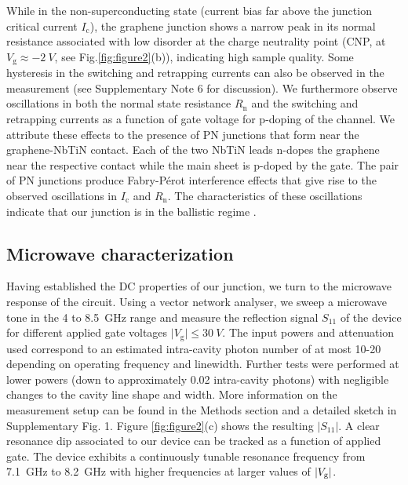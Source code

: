 \documentclass[preprint,
  onecolumn,
  notitlepage,
  amsmath,amssymb,
  aip,
  apl,
]{revtex4-1}
\begin{document}
While in the non-superconducting state (current bias far above the junction critical current $I_\textrm{c}$), the graphene junction shows a narrow peak in its normal resistance associated with low disorder at the charge neutrality point (CNP, at $V_\textrm{g}\approx\SI{-2}{V}$, see Fig.\ref{fig:figure2}(b)), indicating high sample quality.
Some hysteresis in the switching and retrapping currents can also be observed in the measurement (see Supplementary Note 6 for discussion).
We furthermore observe oscillations in both the normal state resistance $R_\textrm{n}$ and the switching and retrapping currents as a function of gate voltage for p-doping of the channel.
We attribute these effects to the presence of PN junctions that form near the graphene-NbTiN contact.
Each of the two NbTiN leads n-dopes the graphene near the respective contact while the main sheet is p-doped by the gate.
The pair of PN junctions produce Fabry-P\'erot interference effects that give rise to the observed oscillations in $I_\textrm{c}$ and $R_\textrm{n}$.
The characteristics of these oscillations indicate that our junction is in the ballistic regime \cite{liang_fabry_2001,miao_phasecoherent_2007,young_quantum_2009,cho_massless_2011,wu_quantum_2012,campos_quantum_2012,rickhaus_ballistic_2013,benshalom_quantum_2015,calado_ballistic_2015a,amet_supercurrent_2016a,borzenets_ballistic_2016a,allen_observation_2017,zhu_supercurrent_2018}.

\subsection{Microwave characterization}

Having established the DC properties of our junction, we turn to the microwave response of the circuit.
Using a vector network analyser, we sweep a microwave tone in the 4 to \SI{8.5}{GHz} range and measure the reflection signal $S_{11}$ of the device for different applied gate voltages $\lvert V_\textrm{g} \rvert \leq \SI{30}{V}$.
The input powers and attenuation used correspond to an estimated intra-cavity photon number of at most 10-20 depending on operating frequency and linewidth.
Further tests were performed at lower powers (down to approximately 0.02 intra-cavity photons) with negligible changes to the cavity line shape and width.
More information on the measurement setup can be found in the Methods section and a detailed sketch in Supplementary Fig. 1.
Figure \ref{fig:figure2}(c) shows the resulting $\lvert S_{11}\rvert$.
A clear resonance dip associated to our device can be tracked as a function of applied gate.
The device exhibits a continuously tunable resonance frequency from \SI{7.1}{GHz} to \SI{8.2}{GHz} with higher frequencies at larger values of $|V_{\rm g}|$.
\end{document}
